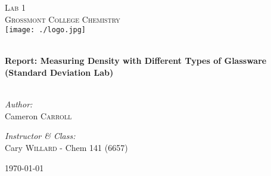 \begin{titlepage}
\begin{center}

\textsc{\Large Lab 1}\\[1.5cm]
\textsc{\Large Grossmont College Chemistry}\\[0.5cm]
\texttt{[image: ./logo.jpg]}

\HRule \\[0.4cm]
{ \LARGE \bfseries Report: Measuring Density with Different Types of Glassware}\\[0.5cm]
{ \large \bfseries (Standard Deviation Lab)}\\[0.5cm]

\HRule \\[1.5cm]

\begin{minipage}{0.4\textwidth}
\begin{flushleft} \large
\emph{Author:}\\
Cameron \textsc{Carroll}\\[0.2cm]

\end{flushleft}
\end{minipage}
\begin{minipage}{0.4\textwidth}
\begin{flushright} \large
\emph{Instructor \& Class:}\\
Cary \textsc{Willard} - Chem 141 (6657)
\end{flushright}
\end{minipage}

\vfill

{\large \today}

\end{center}
\end{titlepage}